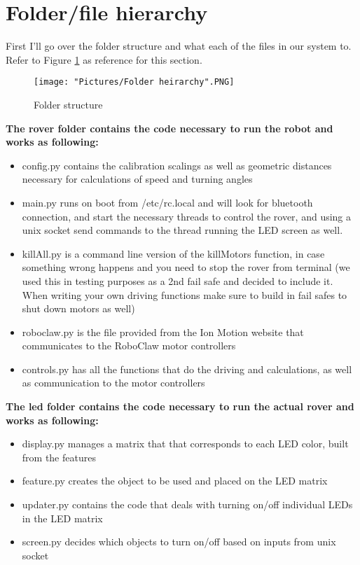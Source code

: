 \documentclass[12pt]{article}
\begin{document}
\section{Folder/file hierarchy}
First I'll go over the folder structure and what each of the files in our system to. Refer to Figure \ref{folders} as reference for this section.
\begin{figure}[H]
 	\centering
	\texttt{[image: "Pictures/Folder heirarchy".PNG]}
 	\caption{Folder structure}
	\label{folders}
\end{figure}
\begin{framed}
\textbf{The rover folder contains the code necessary to run the robot and works as following:}
\end{framed}
\begin{itemize}
	\item config.py contains the calibration scalings as well as geometric distances necessary for calculations of speed and turning angles
	\item main.py runs on boot from /etc/rc.local and will look for bluetooth connection, and start the necessary threads to control the rover, and using a unix socket send commands to the thread running the LED screen as well.
	\item killAll.py is a command line version of the killMotors function, in case something wrong happens and you need to stop the rover from terminal (we used this in testing purposes as a 2nd fail safe and decided to include it. When writing your own driving functions make sure to build in fail safes to shut down motors as well)
	\item roboclaw.py is the file provided from the Ion Motion website that communicates to the RoboClaw motor controllers
	\item controls.py has all the functions that do the driving and calculations, as well as communication to the motor controllers  
\end{itemize}

\begin{framed}
\textbf{The led folder contains the code necessary to run the actual rover and works as following:}
\end{framed}

\begin{itemize}
	\item display.py manages a matrix that that corresponds to each LED color, built from the features
	\item feature.py creates the object to be used and placed on the LED matrix
	\item updater.py contains the code that deals with turning on/off individual LEDs in the LED matrix
	\item screen.py decides which objects to turn on/off based on inputs from unix socket
\end{itemize}
\end{document}
